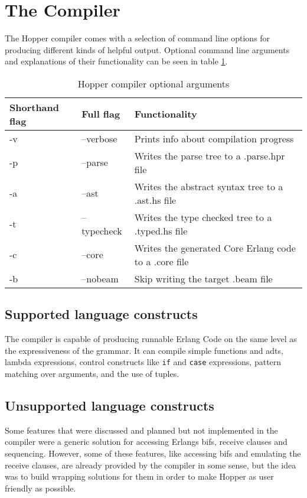 \section{The Compiler}

The Hopper compiler comes with a selection of command line options for producing different kinds of helpful output. Optional command line arguments and explanations of their functionality can be seen in table \ref{tab:flags}.

\begin{table}[!htb]
\centering
\begin{tabular}{| l | l | l |}
\hline
Shorthand flag & Full flag   & Functionality\\
\hline
-v             & --verbose   & Prints info about compilation progress\\
-p             & --parse     & Writes the parse tree to a .parse.hpr file\\
-a             & --ast       & Writes the abstract syntax tree to a .ast.hs file\\
-t             & --typecheck & Writes the type checked tree to a .typed.hs file\\
-c             & --core      & Writes the generated Core Erlang code to a .core file\\
-b             & --nobeam    & Skip writing the target .beam file\\
\hline
\end{tabular}
\caption[Hopper compiler optional arguments]{Hopper compiler optional arguments}
\label{tab:flags}
\end{table}

\subsection{Supported language constructs}
The compiler is capable of producing runnable Erlang Code on the same level as the expressiveness of the grammar. It can compile simple functions and \glspl{adt}, lambda expressions, control constructs like \texttt{if} and \texttt{case} expressions, pattern matching over arguments, and the use of tuples.

\subsection{Unsupported language constructs}

Some features that were discussed and planned but not implemented in the compiler were a generic solution for accessing Erlangs \glspl{bif}, receive clauses and sequencing. However, some of these features, like accessing \glspl{bif} and emulating the receive clauses, are already provided by the compiler in some sense, but the idea was to build wrapping solutions for them in order to make Hopper as user friendly as possible.
